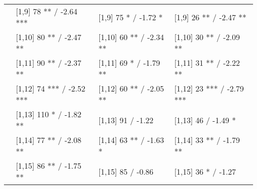 \begin{table}
\begin{tabular}[t]{llll}
 & {}[1,9] 78 ** / -2.64 *** & {}[1,9] 75 * / -1.72 * & {}[1,9] 26 ** / -2.47 **\\
 & {}[1,10] 80 ** / -2.47 ** & {}[1,10] 60 ** / -2.34 ** & {}[1,10] 30 ** / -2.09 **\\
 & {}[1,11] 90 ** / -2.37 ** & {}[1,11] 69 * / -1.79 ** & {}[1,11] 31 ** / -2.22 **\\
 & {}[1,12] 74 *** / -2.52 *** & {}[1,12] 60 ** / -2.05 ** & {}[1,12] 23 *** / -2.79 ***\\
\addlinespace
 & {}[1,13] 110 * / -1.82 ** & {}[1,13] 91  / -1.22 & {}[1,13] 46  / -1.49 *\\
 & {}[1,14] 77 ** / -2.08 ** & {}[1,14] 63 ** / -1.63 * & {}[1,14] 33 ** / -1.79 **\\
 & {}[1,15] 86 ** / -1.75 ** & {}[1,15] 85  / -0.86 & {}[1,15] 36 * / -1.27\\
\bottomrule
\end{tabular}
\end{table}
